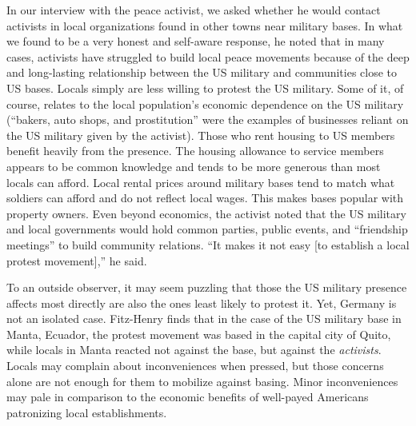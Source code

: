 		In our interview with the peace activist, we asked whether he would contact activists in local organizations found in other towns near military bases. In what we found to be a very honest and self-aware response, he noted that in many cases, activists have struggled to build local peace movements because of the deep and long-lasting relationship between the US military and communities close to US bases. Locals simply are less willing to protest the US military. Some of it, of course, relates to the local population's economic dependence on the US military (``bakers, auto shops, and prostitution'' were the examples of businesses reliant on the US military given by the activist). Those who rent housing to US members benefit heavily from the presence. The housing allowance to service members appears to be common knowledge and tends to be more generous than most locals can afford. Local rental prices around military bases tend to match what soldiers can afford and do not reflect local wages. This makes bases popular with property owners. Even beyond economics, the activist noted that the US military and local governments would hold common parties, public events, and ``friendship meetings'' to build community relations. ``It makes it not easy [to establish a local protest movement],'' he said. 
		
		
		
		To an outside observer, it may seem puzzling that those the US military presence affects most directly are also the ones least likely to protest it. Yet, Germany is not an isolated case. Fitz-Henry finds that in the case of the US military base in Manta, Ecuador, the protest movement was based in the capital city of Quito, while locals in Manta reacted not against the base, but against the \textit{activists}.\cite{Fitz2015} Locals may complain about inconveniences when pressed, but those concerns alone are not enough for them to mobilize against basing. Minor inconveniences may pale in comparison to the economic benefits of well-payed Americans patronizing local establishments.
		
		
		

